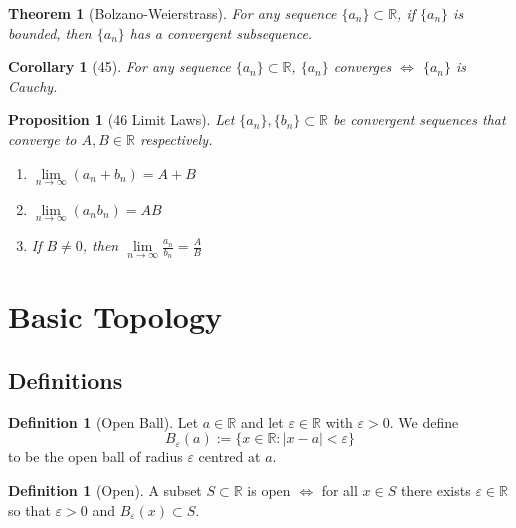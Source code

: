 \documentclass[12pt]{article}
\newtheorem*{thm*}{Theorem}
\newtheorem{cor}[thm]{Corollary}
\newtheorem{prop}[thm]{Proposition}
\theoremstyle{definition}
\newtheorem{defn}[thm]{Definition}
\theoremstyle{remark}
\numberwithin{equation}{section}
\newcommand\R{\mathbb R}    %
\begin{document}
\begin{thm*}[Bolzano-Weierstrass]
        For any sequence $\{a_n\} \subset \R$, if $\{a_n\}$ is bounded, then $\{a_n\}$ has a convergent subsequence.
\end{thm*}



\begin{cor}[45]
        For any sequence $\{a_n\} \subset \R$, $\{a_n\}$ converges $\iff$ $\{a_n\}$ is Cauchy.
\end{cor}



\begin{prop}[46 Limit Laws]
        Let $\{a_n\},\{b_n\} \subset \R$ be convergent sequences that converge to $A,B \in \R$ respectively.
        \begin{enumerate}
                \item $\lim\limits_{n\rightarrow \infty}(a_n+b_n) = A+B$
                \item $\lim\limits_{n\rightarrow \infty}(a_nb_n) = AB$
                \item If $B \neq 0$, then $\lim\limits_{n\rightarrow \infty}\frac{a_n}{b_n} = \frac{A}{B}$
        \end{enumerate}
\end{prop}

\clearpage

\section{Basic Topology}

\subsection{Definitions}

\begin{defn}[Open Ball]
        Let $a \in \R$ and let $\varepsilon \in \R$ with $\varepsilon > 0$. We define \begin{equation}
                B_{\varepsilon}(a) :=\{x \in \R:|x-a| < \varepsilon\}
        \end{equation}
        to be the open ball of radius $\varepsilon$ centred at $a$.
\end{defn}



\begin{defn}[Open]
        A subset $S \subset \R$ is open $\iff$ for all $x \in S$ there exists $\varepsilon \in \R$ so that $\varepsilon > 0$ and $B_{\varepsilon}(x) \subset S$.
\end{defn}
\end{document}

